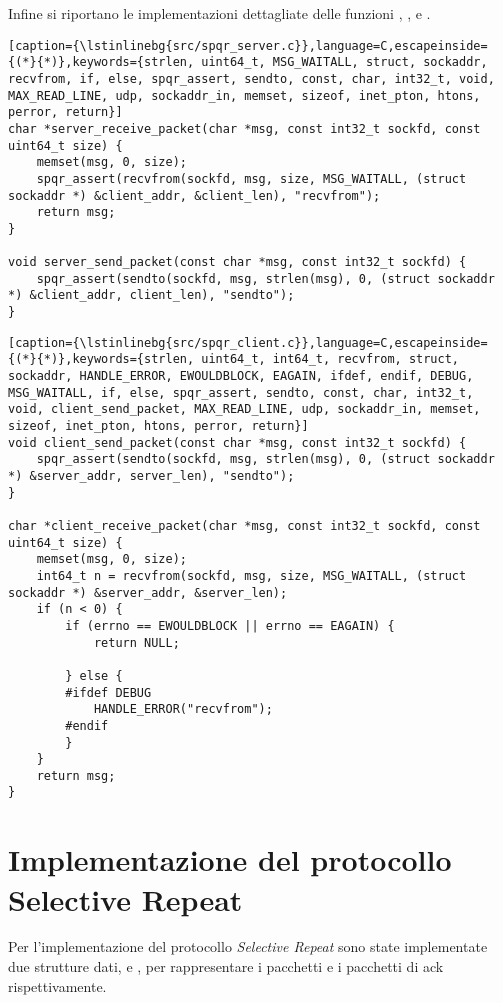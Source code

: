 Infine si riportano le implementazioni dettagliate delle funzioni , ,  e .

\begin{lstlisting}[caption={\lstinlinebg{src/spqr_server.c}},language=C,escapeinside={(*}{*)},keywords={strlen, uint64_t, MSG_WAITALL, struct, sockaddr, recvfrom, if, else, spqr_assert, sendto, const, char, int32_t, void, MAX_READ_LINE, udp, sockaddr_in, memset, sizeof, inet_pton, htons, perror, return}]
char *server_receive_packet(char *msg, const int32_t sockfd, const uint64_t size) {
    memset(msg, 0, size);
    spqr_assert(recvfrom(sockfd, msg, size, MSG_WAITALL, (struct sockaddr *) &client_addr, &client_len), "recvfrom");
    return msg;
}

void server_send_packet(const char *msg, const int32_t sockfd) {
    spqr_assert(sendto(sockfd, msg, strlen(msg), 0, (struct sockaddr *) &client_addr, client_len), "sendto");
}
\end{lstlisting}

\begin{lstlisting}[caption={\lstinlinebg{src/spqr_client.c}},language=C,escapeinside={(*}{*)},keywords={strlen, uint64_t, int64_t, recvfrom, struct, sockaddr, HANDLE_ERROR, EWOULDBLOCK, EAGAIN, ifdef, endif, DEBUG, MSG_WAITALL, if, else, spqr_assert, sendto, const, char, int32_t, void, client_send_packet, MAX_READ_LINE, udp, sockaddr_in, memset, sizeof, inet_pton, htons, perror, return}]
void client_send_packet(const char *msg, const int32_t sockfd) {
    spqr_assert(sendto(sockfd, msg, strlen(msg), 0, (struct sockaddr *) &server_addr, server_len), "sendto");
}

char *client_receive_packet(char *msg, const int32_t sockfd, const uint64_t size) {
    memset(msg, 0, size);
    int64_t n = recvfrom(sockfd, msg, size, MSG_WAITALL, (struct sockaddr *) &server_addr, &server_len);
    if (n < 0) {
        if (errno == EWOULDBLOCK || errno == EAGAIN) {
            return NULL;

        } else {
        #ifdef DEBUG
            HANDLE_ERROR("recvfrom");
        #endif
        }
    }
    return msg;
}
\end{lstlisting}

\section{Implementazione del protocollo Selective Repeat}
Per l'implementazione del protocollo \textit{Selective Repeat} sono state implementate due strutture dati,  e , per rappresentare i pacchetti e i pacchetti di ack rispettivamente.

